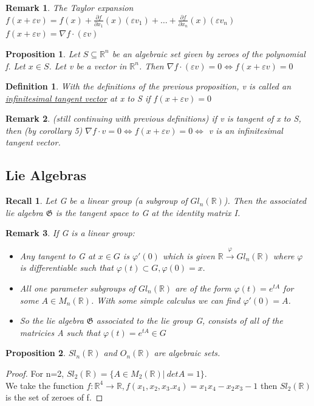 \documentclass{article}
\newtheorem{definition}{Definition}
\newtheorem{remark}{Remark}
\newtheorem{proposition}{Proposition}
\newtheorem{recall}{Recall}
\begin{document}
\begin{remark}
  The Taylor expansion $f(x + \varepsilon v) = f(x) + \frac{\partial f}{\partial x_1}(x)(\varepsilon v_1) + \dots + \frac{\partial f}{\partial x_n}(x)(\varepsilon v_n)$
  \\
  $f(x + \varepsilon v) = \nabla f \cdot (\varepsilon v)$
\end{remark}
\begin{proposition}
  Let $S \subseteq \mathbb{R}^n$ be an algebraic set given by zeroes of the polynomial f. Let $x \in S$. Let v be a vector in $\mathbb{R}^n$. Then $\nabla f \cdot (\varepsilon v) = 0 \iff f(x + \varepsilon v) = 0$
\end{proposition}
\begin{definition}
  With the definitions of the previous proposition, v is called an \underline{infinitesimal tangent vector} at x to S if $f(x + \varepsilon v) = 0$
\end{definition}
\begin{remark}
  (still continuing with previous definitions) if v is tangent of x to S, then (by corollary 5) $\nabla f \cdot v = 0 \iff f(x + \varepsilon v) = 0 \iff $ v is an infinitesimal tangent vector.
\end{remark}
\subsection{Lie Algebras}
\begin{recall}
  Let G be a linear group (a subgroup of $Gl_n(\mathbb{R})$). Then the associated lie algebra $\mathfrak{G}$ is the tangent space to G at the identity matrix I.
\end{recall}
\begin{remark}
  If G is a linear group:
  \begin{itemize}
    \item Any tangent to G at $x\in G$ is $\varphi'(0)$ which is given $\mathbb{R} \overset{\varphi}{\to} Gl_n(\mathbb{R})$ where $\varphi$ is differentiable such that $\varphi(t) \subset G, \varphi(0) = x.$
    \item All one parameter subgroups of $Gl_n(\mathbb{R})$ are of the form $\varphi(t) = e^{tA}$ for some $A \in M_n(\mathbb{R})$. With some simple calculus we can find $\varphi'(0) = A$.
    \item So the lie algebra $\mathfrak{G}$ associated to the lie group G, consists of all of the matricies A such that $\varphi(t) = e^{tA} \in G$
  \end{itemize}
\end{remark}
\begin{proposition}
  $Sl_n(\mathbb{R})$ and $O_n(\mathbb{R})$ are algebraic sets.
\end{proposition}
\begin{proof}
  For n=2, $Sl_2(\mathbb{R}) = \{A \in M_2(\mathbb{R}) \vert \: det A = 1 \}$.
  \\
  We take the function $f: \mathbb{R}^4 \to \mathbb{R}, f(x_1, x_2, x_3. x_4) = x_1x_4 - x_2x_3 - 1$ then $Sl_2(\mathbb{R})$ is the set of zeroes of f.
\end{proof}
\end{document}
